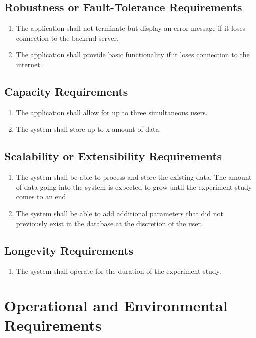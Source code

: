 \documentclass[12pt]{article}
\begin{document}
\subsection{Robustness or Fault-Tolerance Requirements}
\begin{enumerate}
  \item The application shall not terminate but display an error message if it loses connection to the backend server.
  \item The application shall provide basic functionality if it loses connection to the internet.
\end{enumerate}

\subsection{Capacity Requirements}
\begin{enumerate}
  \item The application shall allow for up to three simultaneous users.
  \item The system shall store up to x amount of data.
\end{enumerate}

\subsection{Scalability or Extensibility Requirements}
\begin{enumerate}
  \item The system shall be able to process and store the existing data. The amount of data going into the system is expected to grow until the experiment study comes to an end.
  \item The system shall be able to add additional parameters that did not previously exist in the database at the discretion of the user.
\end{enumerate}

\subsection{Longevity Requirements}
\begin{enumerate}
  \item The system shall operate for the duration of the experiment study.
\end{enumerate}

\section{Operational and Environmental Requirements}
\end{document}
